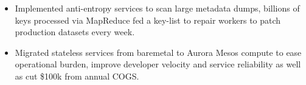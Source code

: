 \begin{mdframed}[linewidth=2,linecolor=blue, innertopmargin=1em, innerbottommargin=1em, topline=false, rightline=false, bottomline=false]
\begin{itemize}
         \item Implemented anti-entropy services to scan large metadata dumps, billions of keys processed via MapReduce fed a key-list to repair workers to patch production datasets every week. 
         \item Migrated stateless services from baremetal to Aurora Mesos compute to ease operational burden, improve developer velocity and service reliability as well as cut \$100k from annual COGS.
     \end{itemize}
    \end{mdframed}
